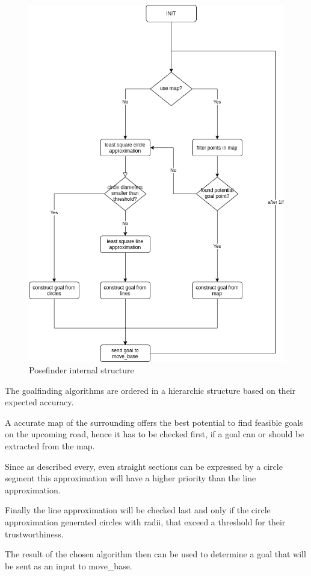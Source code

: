 \begin{figure}[H]
	\centering
	\includegraphics[width=.9\textwidth]{Pictures/posefinder diagram}
	\caption{Posefinder internal structure}
	\label{posefinder structure}
\end{figure}

The goalfinding algorithms are ordered in a hierarchic structure based on their expected accuracy.

A accurate map of the surrounding offers the best potential to find feasible goals on the upcoming road, hence it has to be checked first, if a goal can or should be extracted from the map.

Since as described every, even straight sections can be expressed by a circle segment this approximation will have a higher priority than the line approximation.

Finally the line approximation will be checked last and only if the circle approximation generated circles with radii, that exceed a threshold for their trustworthiness.

The result of the chosen algorithm then can be used to determine a goal that will be sent as an input to move\_base.

